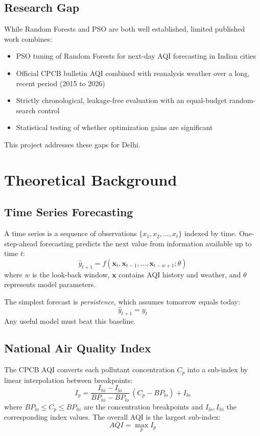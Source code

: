 \subsection{Research Gap}
While Random Forests and PSO are both well established, limited published work combines:
\begin{itemize}
\item PSO tuning of Random Forests for next-day AQI forecasting in Indian cities
\item Official CPCB bulletin AQI combined with reanalysis weather over a long, recent period (2015 to 2026)
\item Strictly chronological, leakage-free evaluation with an equal-budget random-search control
\item Statistical testing of whether optimization gains are significant
\end{itemize}
This project addresses these gaps for Delhi.

\section{Theoretical Background}

\subsection{Time Series Forecasting}
A time series is a sequence of observations $\{x_1, x_2, \dots, x_t\}$ indexed by time. One-step-ahead forecasting predicts the next value from information available up to time $t$:
\begin{equation}
\hat{y}_{t+1} = f(\mathbf{x}_t, \mathbf{x}_{t-1}, \dots, \mathbf{x}_{t-w+1}; \theta)
\end{equation}
where $w$ is the look-back window, $\mathbf{x}$ contains AQI history and weather, and $\theta$ represents model parameters.

The simplest forecast is \emph{persistence}, which assumes tomorrow equals today:
\begin{equation}
\hat{y}_{t+1} = y_t
\end{equation}
Any useful model must beat this baseline.

\subsection{National Air Quality Index}
The CPCB AQI \cite{cpcb2014} converts each pollutant concentration $C_p$ into a sub-index by linear interpolation between breakpoints:
\begin{equation}
I_p = \frac{I_{hi} - I_{lo}}{BP_{hi} - BP_{lo}}\,(C_p - BP_{lo}) + I_{lo}
\end{equation}
where $BP_{lo} \le C_p \le BP_{hi}$ are the concentration breakpoints and $I_{lo}, I_{hi}$ the corresponding index values. The overall AQI is the largest sub-index:
\begin{equation}
AQI = \max_p I_p
\end{equation}

